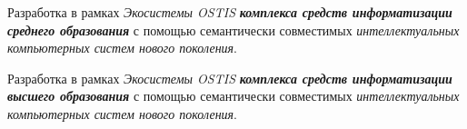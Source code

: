 \begin{textitemize}
	\medskip
	\item Разработка в рамках \textit{Экосистемы OSTIS} \textbf{\textit{комплекса средств информатизации среднего образования}} с помощью семантически совместимых \textit{интеллектуальных компьютерных систем нового поколения}.
	\medskip
	\item Разработка в рамках \textit{Экосистемы OSTIS} \textbf{\textit{комплекса средств информатизации высшего  образования}} с помощью семантически совместимых \textit{интеллектуальных компьютерных систем нового поколения}.
\end{textitemize}